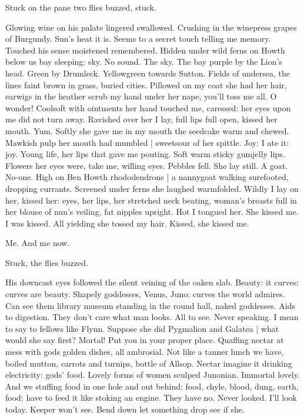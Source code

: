 Stuck on the pane two flies buzzed,
stuck.

Glowing wine on his palate lingered swallowed.
Crushing in the winepress grapes of Burgundy.
Sun's heat it is.
Seems to a secret touch telling me memory.
Touched his sense moistened remembered.
Hidden under wild ferns on Howth below us bay sleeping:
sky.
No sound.
The sky.
The bay purple by the Lion's head.
Green by Drumleck.
Yellowgreen towards Sutton.
Fields of undersea,
the lines faint brown in grass,
buried cities.
Pillowed on my coat she had her hair,
earwigs in the heather scrub my hand under her nape,
you'll toss me all.
O wonder!
Coolsoft with ointments her hand touched me,
caressed:
her eyes upon me did not turn away.
Ravished over her I lay,
full lips full open,
kissed her mouth.
Yum.
Softly she gave me in my mouth the seedcake warm and chewed.
Mawkish pulp her mouth had mumbled |
sweetsour of her spittle.
Joy:
I ate it:
joy.
Young life,
her lips that gave me pouting.
Soft warm sticky gumjelly lips.
Flowers her eyes were,
take me,
willing eyes.
Pebbles fell.
She lay still.
A goat.
No-one.
High on Ben Howth rhododendrons |
a nannygoat walking surefooted, dropping currants.
Screened under ferns she laughed warmfolded.
Wildly I lay on her,
kissed her:
eyes, her lips,
her stretched neck beating,
woman's breasts full in her blouse of nun's veiling,
fat nipples upright.
Hot I tongued her.
She kissed me.
I was kissed.
All yielding she tossed
my hair.
Kissed, she kissed me.

Me.
And me now.

Stuck,
the flies buzzed.

His downcast eyes followed the silent veining of the oaken slab.
Beauty:
it curves:
curves are beauty.
Shapely goddesses,
Venus, Juno:
curves the world admires.
Can see them library museum standing in the round hall,
naked goddesses.
Aids to digestion.
They don't care what man looks.
All to see.
Never speaking.
I mean to say to fellows like Flynn.
Suppose she did Pygmalion and Galatea |
what would she say first?
Mortal!
Put you in your proper place.
Quaffing nectar at mess with gods golden dishes,
all ambrosial.
Not like a tanner lunch we have,
boiled mutton, carrots and turnips,
bottle of Allsop.
Nectar imagine it drinking electricity:
gods' food.
Lovely forms of women sculped Junonian.
Immortal lovely.
And we stuffing food in one hole and out behind:
food, chyle, blood, dung, earth, food:
have to feed it like stoking an engine.
They have no.
Never looked.
I'll look today.
Keeper won't see.
Bend down let something drop
see if she.

